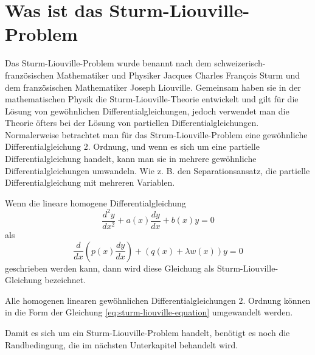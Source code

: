 %
%
%

%

\section{Was ist das Sturm-Liouville-Problem\label{sturmliouville:section:teil0}}
Das Sturm-Liouville-Problem wurde benannt nach dem schweizerisch-französischen
Mathematiker und Physiker Jacques Charles Fran\c{c}ois Sturm und dem
französischen Mathematiker Joseph Liouville.
Gemeinsam haben sie in der mathematischen Physik die Sturm-Liouville-Theorie
entwickelt und gilt für die Lösung von gewöhnlichen Differentialgleichungen,
jedoch verwendet man die Theorie öfters bei der Lösung von partiellen
Differentialgleichungen.
Normalerweise betrachtet man für das Strum-Liouville-Problem eine gewöhnliche
Differentialgleichung 2. Ordnung, und wenn es sich um eine partielle
Differentialgleichung handelt, kann man sie in mehrere gewöhnliche
Differentialgleichungen umwandeln. Wie z. B. den Separationsansatz, die
partielle Differentialgleichung mit mehreren Variablen.

\begin{definition}
Wenn die lineare homogene Differentialgleichung
\begin{equation}
	\frac{d^2y}{dx^2} + a(x)\frac{dy}{dx} + b(x)y = 0
\end{equation}
als
\begin{equation}
	\label{eq:sturm-liouville-equation}
	\frac{d}{dx} (p(x) \frac{dy}{dx}) + (q(x) +
	\lambda w(x)) y
	=
	0 
\end{equation}
geschrieben werden kann, dann wird diese Gleichung als Sturm-Liouville-Gleichung
bezeichnet.
\end{definition}
Alle homogenen linearen gewöhnlichen Differentialgleichungen 2. Ordnung können
in die Form der Gleichung \eqref{eq:sturm-liouville-equation} umgewandelt
werden.

Damit es sich um ein Sturm-Liouville-Problem handelt, benötigt es noch die Randbedingung, die im nächsten Unterkapitel behandelt wird. 

